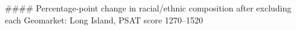 #### Percentage-point change in racial/ethnic composition after excluding each Geomarket: Long Island, PSAT score 1270–1520
